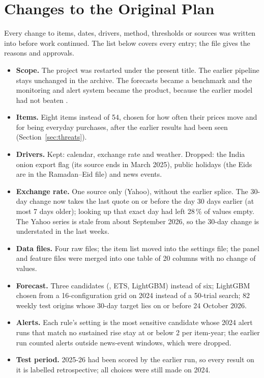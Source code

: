 \chapter{Changes to the Original Plan}\label{app:deviations}
Every change to items, dates, drivers, method, thresholds or sources was written into  before work continued. The list below covers every entry; the file gives the reasons and approvals.
\begin{itemize}[leftmargin=*,itemsep=2pt]
\item \textbf{Scope.} The project was restarted under the present title. The earlier pipeline stays unchanged in the archive. The forecasts became a benchmark and the monitoring and alert system became the product, because the earlier model had not beaten \naive{}.
\item \textbf{Items.} Eight items instead of 54, chosen for how often their prices move and for being everyday purchases, after the earlier results had been seen (Section~\ref{sec:threats}).
\item \textbf{Drivers.} Kept: calendar, exchange rate and weather. Dropped: the India onion export flag (its source ends in March 2025), public holidays (the Eids are in the Ramadan--Eid file) and news events.
\item \textbf{Exchange rate.} One source only (Yahoo), without the earlier splice. The 30-day change now takes the last quote on or before the day 30 days earlier (at most 7 days older); looking up that exact day had left 28\,\% of values empty. The Yahoo series is stale from about September 2026, so the 30-day change is understated in the last weeks.
\item \textbf{Data files.} Four raw files; the item list moved into the settings file; the panel and feature files were merged into one table of 20 columns with no change of values.
\item \textbf{Forecast.} Three candidates (\naive{}, ETS, LightGBM) instead of six; LightGBM chosen from a 16-configuration grid on 2024 instead of a 50-trial search; 82 weekly test origins whose 30-day target lies on or before 24 October 2026.
\item \textbf{Alerts.} Each rule's setting is the most sensitive candidate whose 2024 alert runs that match no sustained rise stay at or below 2 per item-year; the earlier run counted alerts outside news-event windows, which were dropped.
\item \textbf{Test period.} 2025-26 had been scored by the earlier run, so every result on it is labelled retrospective; all choices were still made on 2024.

\end{itemize}
